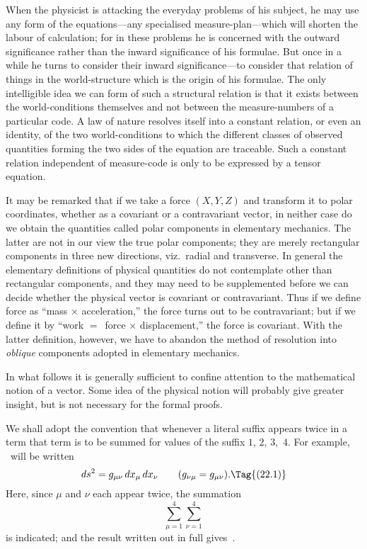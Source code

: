\documentclass[12pt]{book}
\begin{document}
When the physicist is attacking the everyday problems of his subject, he
may use any form of the equations---any specialised measure-plan---which
will shorten the labour of calculation; for in these problems he is concerned
with the outward significance rather than the inward significance of his
formulae. But once in a while he turns to consider their inward significance---to
consider that relation of things in the world-structure which is the
origin of his formulae. The only intelligible idea we can form of such a
structural relation is that it exists between the world-conditions themselves
and not between the measure-numbers of a particular code. A law of nature
resolves itself into a constant relation, or even an identity, of the two world-conditions
to which the different classes of observed quantities forming the
two sides of the equation are traceable. Such a constant relation independent
of measure-code is only to be expressed by a tensor equation.

It may be remarked that if we take a force $(X, Y, Z)$ and transform it to
%
polar coordinates, whether as a covariant or a contravariant vector, in neither
case do we obtain the quantities called polar components in elementary
mechanics. The latter are not in our view the true polar components; they
are merely rectangular components in three new directions, viz.\ radial and
transverse. In general the elementary definitions of physical quantities do
not contemplate other than rectangular components, and they may need to
be supplemented before we can decide whether the physical vector is covariant
or contravariant. Thus if we define force as ``mass $\times$ acceleration,'' the force
turns out to be contravariant; but if we define it by ``work $=$~force $\times$ displacement,''
the force is covariant. With the latter definition, however, we have
to abandon the method of resolution into \emph{oblique} components adopted in
elementary mechanics.

In what follows it is generally sufficient to confine attention to the mathematical
notion of a vector. Some idea of the physical notion will probably
give greater insight, but is not necessary for the formal proofs.

%

We shall adopt the convention that whenever a literal suffix appears twice
in a term that term is to be summed for values of the suffix $1$, $2$, $3$,~$4$. For
example, ~will be written
\[
ds^{2} = g_{\mu\nu}\, dx_{\mu}\, dx_{\nu}\qquad (g_{\nu\mu} = g_{\mu\nu}).
\Tag{(22.1)}
\]
Here, since $\mu$ and $\nu$ each appear twice, the summation
\[
\sum_{\mu=1}^{4} \sum_{\nu=1}^{4}
\]
is indicated; and the result written out in full gives~.
\end{document}
